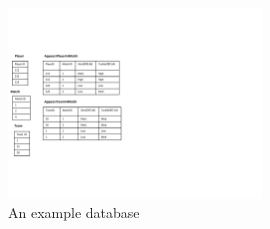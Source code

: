  	 	\begin{figure}
 	 		\centering
 	 		\includegraphics[width=0.6\textwidth] {figures/databasefigure.pdf}
 	 		\caption{An example database
 	 			\label{main:a-chap3}}
 	 	\end{figure}
 	 	
 	 	
 	 	
 	 	
